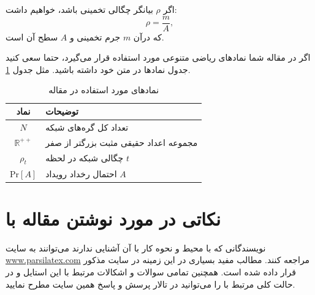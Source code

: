 \documentclass{CSICC2020}
\begin{document}
اگر $\rho$ بیانگر چگالی تخمینی باشد، خواهیم داشت:
\begin{equation}
\rho = \frac{m}{A},
\end{equation}
كه درآن  $m$ جرم تخمینی و $A$ سطح آن است. 

اگر در مقاله شما نمادهای ریاضی متنوعی مورد استفاده قرار می‌گیرد، حتما سعی کنید جدول نمادها در متن خود داشته باشید. مثل جدول \ref{tab:symbols}.
\begin{table}[H]
\centering
\caption{نمادهای مورد استفاده در  مقاله}
\label{tab:symbols}
\begin{tabular}{cp{6cm}}\hline
نماد & توضیحات
\\\hline
$N$ &
تعداد کل گره‌های شبکه
\\
$\mathbb{R}^{++}$ &
مجموعه اعداد حقیقی مثبت بزرگتر از صفر
\\
$\rho_{t}$ &
چگالی شبکه در لحظه $t$
\\
$\mathrm{Pr}[A]$ &
احتمال رخداد رویداد $A$
\\
\hline
\end{tabular}
\end{table}







\section{نکاتی در مورد نوشتن مقاله با \lr{\LaTeX}}


نویسندگانی که با محیط \lr{\LaTeX} و نحوه کار با آن آشنایی ندارند می‌توانند به سایت
\url{www.parsilatex.com}
مراجعه کنند. مطالب مفید بسیاری در این زمینه در سایت مذکور قرار داده شده است. همچنین تمامی سوالات و اشکالات مرتبط با این استایل  و در حالت کلی مرتبط با \lr{\LaTeX} را می‌توانید در تالار پرسش و پاسخ همین سایت مطرح نمایید.  
\end{document}
